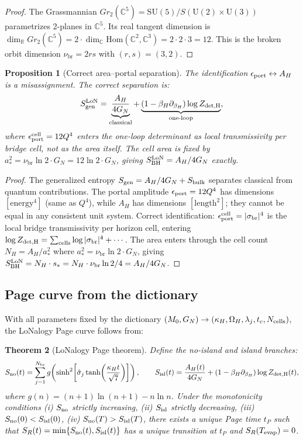 \documentclass[12pt]{article}
\theoremstyle{plain}
\newtheorem{theorem}{Theorem}[section]
\newtheorem{proposition}[theorem]{Proposition}
\theoremstyle{definition}
\numberwithin{equation}{section}
\newcommand{\br}{\mathrm{br}}
\begin{document}
\begin{proof}
The Grassmannian $Gr_2(\mathbb{C}^5)=\mathrm{SU}(5)/S(\mathrm{U}(2)\times\mathrm{U}(3))$ parametrizes
2-planes in $\mathbb{C}^5$.  Its real tangent dimension is
$\dim_\mathbb{R} Gr_2(\mathbb{C}^5)=2\cdot\dim_\mathbb{C}\mathrm{Hom}(\mathbb{C}^2,\mathbb{C}^3)=2\cdot2\cdot3=12$.
This is the broken orbit dimension $\nu_\br=2rs$ with $(r,s)=(3,2)$.
\end{proof}

\begin{proposition}[Correct area--portal separation]\label{prop:BHsep}
The identification $\epsilon_{\rm port} \leftrightarrow A_H$ is a misassignment.  The correct separation is:
\[
S_{\rm gen}^{\rm LoN} = \underbrace{\frac{A_H}{4G_N}}_{\rm classical} + \underbrace{\left(1-\beta_H\partial_{\beta_H}\right)\log Z_{\rm det,H}}_{\rm one\text{-}loop},
\]
where $\epsilon_{\rm port}^{\rm cell} = 12Q^4$ enters the one-loop determinant as local transmissivity per bridge cell, not as the area itself.  The cell area is fixed by $a_*^2 = \nu_\br\ln 2\cdot G_N = 12\ln 2\cdot G_N$, giving $S_{\rm BH}^{\rm LoN} = A_H/4G_N$ exactly.
\end{proposition}

\begin{proof}
The generalized entropy $S_{\rm gen}=A_H/4G_N+S_{\rm bulk}$ separates classical from quantum contributions.
The portal amplitude $\epsilon_{\rm port}=12Q^4$ has dimensions $[\mathrm{energy}^4]$ (same as $Q^4$),
while $A_H$ has dimensions $[\mathrm{length}^2]$; they cannot be equal in any consistent unit system.
Correct identification: $\epsilon_{\rm port}^{\rm cell}=|\sigma_\br|^4$ is the local bridge transmissivity per horizon cell,
entering $\log Z_{\rm det,H}=\sum_{\rm cells}\log|\sigma_\br|^4+\cdots$.
The area enters through the cell count $N_H=A_H/a_*^2$ where $a_*^2=\nu_\br\ln 2\cdot G_N$,
giving $S_{\rm BH}^{\rm LoN}=N_H\cdot s_*=N_H\cdot\nu_\br\ln 2/4=A_H/4G_N$.
\end{proof}

\subsection{Page curve from the dictionary}

With all parameters fixed by the dictionary $(M_0, G_N) \to (\kappa_H, \Omega_H, \lambda_j, t_c, N_{\rm cells})$, the LoNalogy Page curve follows from:

\begin{theorem}[LoNalogy Page theorem]\label{thm:BHpage}
Define the no-island and island branches:
\[
S_{\rm no}(t) = \sum_{j=1}^{N_\br} g\!\left(\sinh^2\!\left[\hat{\sigma}_j\tanh\!\left(\frac{\kappa_H t}{\sqrt{7}}\right)\right]\right),
\qquad
S_{\rm isl}(t) = \frac{A_H(t)}{4G_N} + \left(1-\beta_H\partial_{\beta_H}\right)\log Z_{\rm det,H}(t),
\]
where $g(n) = (n+1)\ln(n+1) - n\ln n$.  Under the monotonicity conditions (i) $S_{\rm no}$ strictly increasing, (ii) $S_{\rm isl}$ strictly decreasing, (iii) $S_{\rm no}(0) < S_{\rm isl}(0)$, (iv) $S_{\rm no}(T) > S_{\rm isl}(T)$, there exists a unique Page time $t_P$ such that $S_R(t) = \min\{S_{\rm no}(t), S_{\rm isl}(t)\}$ has a unique transition at $t_P$ and $S_R(T_{\rm evap}) = 0$.
\end{theorem}
\end{document}
